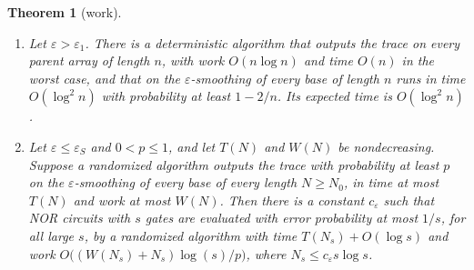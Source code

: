 \documentclass[11pt]{amsart}
\newtheorem{theorem}{Theorem}
\theoremstyle{definition}
\theoremstyle{remark}
\newcommand{\eps}{\varepsilon}
\begin{document}
\begin{theorem}[work]\label{thm:work}
\begin{enumerate}[label=(\alph*),leftmargin=2.4em]
\item Let $\eps>\eps_1$. There is a deterministic algorithm that outputs the trace on every parent
array of length $n$, with work $O(n\log n)$ and time $O(n)$ in the worst case, and that on the
$\eps$-smoothing of every base of length $n$ runs in time $O(\log^2n)$ with probability at least
$1-2/n$. Its expected time is $O(\log^2n)$.
\item Let $\eps\le\eps_S$ and $0<p\le1$, and let $T(N)$ and $W(N)$ be nondecreasing. Suppose a
randomized algorithm outputs the trace with probability at least $p$ on the $\eps$-smoothing of
every base of every length $N\ge N_0$, in time at most $T(N)$ and work at most $W(N)$. Then there
is a constant $c_\eps$ such that NOR circuits with $s$ gates are evaluated with error probability
at most $1/s$, for all large $s$, by a randomized algorithm with time $T(N_s)+O(\log s)$ and work
$O\bigl((W(N_s)+N_s)\log(s)/p\bigr)$, where $N_s\le c_\eps s\log s$.
\end{enumerate}
\end{theorem}
\end{document}

